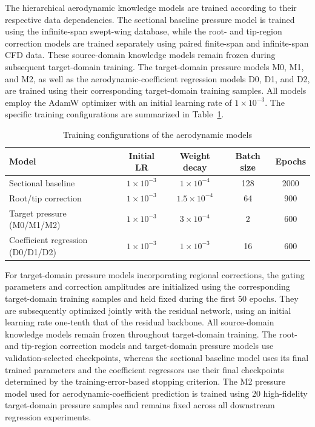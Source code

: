 The hierarchical aerodynamic knowledge models are trained according to their respective data dependencies. The sectional baseline pressure model is trained using the infinite-span swept-wing database, while the root- and tip-region correction models are trained separately using paired finite-span and infinite-span CFD data. These source-domain knowledge models remain frozen during subsequent target-domain training. The target-domain pressure models M0, M1, and M2, as well as the aerodynamic-coefficient regression models D0, D1, and D2, are trained using their corresponding target-domain training samples. All models employ the AdamW optimizer with an initial learning rate of $1\times10^{-3}$. The specific training configurations are summarized in Table~\ref{tab:training-configurations}.

\begin{table}[htbp]
    \centering
    \caption{Training configurations of the aerodynamic models}
    \label{tab:training-configurations}
    \small
    \setlength{\tabcolsep}{5pt}
    \renewcommand{\arraystretch}{1.15}
    \begin{tabular}{@{}lcccc@{}}
        \hline
        Model & Initial LR & Weight decay & Batch size & Epochs \\
        \hline
        Sectional baseline
        & $1\times10^{-3}$ & $1\times10^{-4}$ & 128 & 2000 \\

        Root/tip correction
        & $1\times10^{-3}$ & $1.5\times10^{-4}$ & 64 & 900 \\

        Target pressure (M0/M1/M2)
        & $1\times10^{-3}$ & $3\times10^{-4}$ & 2 & 600 \\

        Coefficient regression (D0/D1/D2)
        & $1\times10^{-3}$ & $1\times10^{-3}$ & 16 & 600 \\
        \hline
    \end{tabular}
\end{table}

For target-domain pressure models incorporating regional corrections, the gating parameters and correction amplitudes are initialized using the corresponding target-domain training samples and held fixed during the first 50 epochs. They are subsequently optimized jointly with the residual network, using an initial learning rate one-tenth that of the residual backbone. All source-domain knowledge models remain frozen throughout target-domain training. The root- and tip-region correction models and target-domain pressure models use validation-selected checkpoints, whereas the sectional baseline model uses its final trained parameters and the coefficient regressors use their final checkpoints determined by the training-error-based stopping criterion. The M2 pressure model used for aerodynamic-coefficient prediction is trained using 20 high-fidelity target-domain pressure samples and remains fixed across all downstream regression experiments.
